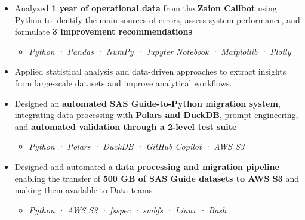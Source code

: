 \documentclass[10pt,english,french]{article}
\begin{document}
\vspace{-5pt}
\begin{itemize}[leftmargin=0.5cm, label=\textbullet, itemsep=0.05em]
    \item Analyzed \textbf{1 year of operational data} from the \textbf{Zaion Callbot}
          using Python to identify the main sources of errors,
          assess system performance, and formulate \textbf{3 improvement recommendations}
          \begin{itemize}[leftmargin=0.25cm,label=\textendash,itemsep=0em,topsep=0.1em]
              \item \textit{\fontsize{10pt}{9pt}\selectfont Python · Pandas · NumPy · Jupyter Notebook · Matplotlib · Plotly}
          \end{itemize}

    \item Applied statistical analysis and data-driven approaches to extract insights
          from large-scale datasets and improve analytical workflows.

    \item Designed an \textbf{automated SAS Guide-to-Python migration system},
          integrating data processing with \textbf{Polars and DuckDB},
          prompt engineering, and \textbf{automated validation through a 2-level test suite}
          \begin{itemize}[leftmargin=0.25cm,label=\textendash,itemsep=0em,topsep=0.1em]
              \item \textit{\fontsize{10pt}{9pt}\selectfont Python · Polars · DuckDB · GitHub Copilot · AWS S3}
          \end{itemize}

    \item Designed and automated a \textbf{data processing and migration pipeline}
          enabling the transfer of \textbf{500\raisebox{0.20ex}{\small +} GB of SAS Guide datasets to AWS S3}
          and making them available to Data teams
          \begin{itemize}[leftmargin=0.25cm,label=\textendash,itemsep=0em,topsep=0.1em]
              \item \textit{\fontsize{10pt}{9pt}\selectfont Python · AWS S3 · fsspec · smbfs · Linux · Bash}
          \end{itemize}



\end{itemize}
\end{document}
